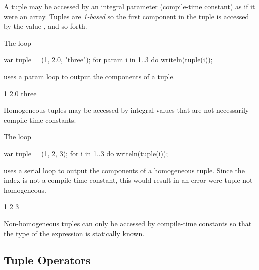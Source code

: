 A tuple may be accessed by an integral parameter (compile-time
constant) as if it were an array.  Tuples are \emph{1-based} so the
first component in the tuple is accessed by the value , and so
forth.

\begin{example}
\begin{chapelpre}
\end{chapelpre}
The loop
\begin{chapel}
var tuple = (1, 2.0, "three");
for param i in 1..3 do
  writeln(tuple(i));
\end{chapel}
uses a param loop to output the components of a tuple.
\begin{chapelpost}
\end{chapelpost}
\begin{chapeloutput}
1
2.0
three
\end{chapeloutput}
\end{example}

Homogeneous tuples may be accessed by integral values that are not
necessarily compile-time constants.

\begin{example}
\begin{chapelpre}
\end{chapelpre}
The loop
\begin{chapel}
var tuple = (1, 2, 3);
for i in 1..3 do
  writeln(tuple(i));
\end{chapel}
uses a serial loop to output the components of a homogeneous tuple.
Since the index is not a compile-time constant, this would result in
an error were tuple not homogeneous.
\begin{chapelpost}
\end{chapelpost}
\begin{chapeloutput}
1
2
3
\end{chapeloutput}
\end{example}

\begin{rationale}
Non-homogeneous tuples can only be accessed by compile-time constants
so that the type of the expression is statically known.
\end{rationale}

\subsection{Tuple Operators}
\label{Tuple_Operators}

